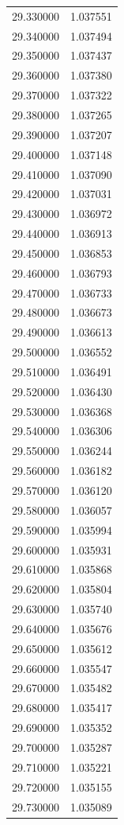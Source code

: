 \begin{tabular}{rr}
29.330000 & 1.037551 \\
29.340000 & 1.037494 \\
29.350000 & 1.037437 \\
29.360000 & 1.037380 \\
29.370000 & 1.037322 \\
29.380000 & 1.037265 \\
29.390000 & 1.037207 \\
29.400000 & 1.037148 \\
29.410000 & 1.037090 \\
29.420000 & 1.037031 \\
29.430000 & 1.036972 \\
29.440000 & 1.036913 \\
29.450000 & 1.036853 \\
29.460000 & 1.036793 \\
29.470000 & 1.036733 \\
29.480000 & 1.036673 \\
29.490000 & 1.036613 \\
29.500000 & 1.036552 \\
29.510000 & 1.036491 \\
29.520000 & 1.036430 \\
29.530000 & 1.036368 \\
29.540000 & 1.036306 \\
29.550000 & 1.036244 \\
29.560000 & 1.036182 \\
29.570000 & 1.036120 \\
29.580000 & 1.036057 \\
29.590000 & 1.035994 \\
29.600000 & 1.035931 \\
29.610000 & 1.035868 \\
29.620000 & 1.035804 \\
29.630000 & 1.035740 \\
29.640000 & 1.035676 \\
29.650000 & 1.035612 \\
29.660000 & 1.035547 \\
29.670000 & 1.035482 \\
29.680000 & 1.035417 \\
29.690000 & 1.035352 \\
29.700000 & 1.035287 \\
29.710000 & 1.035221 \\
29.720000 & 1.035155 \\
29.730000 & 1.035089 \\

\end{tabular}
